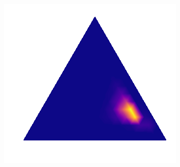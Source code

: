 \begin{figure}
\begin{minipage}{.3\textwidth}
\subcaption{}
\end{minipage}
 \begin{minipage}{.3\textwidth}
    \includegraphics[width=\textwidth]{plots/experiment_structures/triangle_1overfit.png}
\subcaption{}
\end{minipage}



\end{figure}
